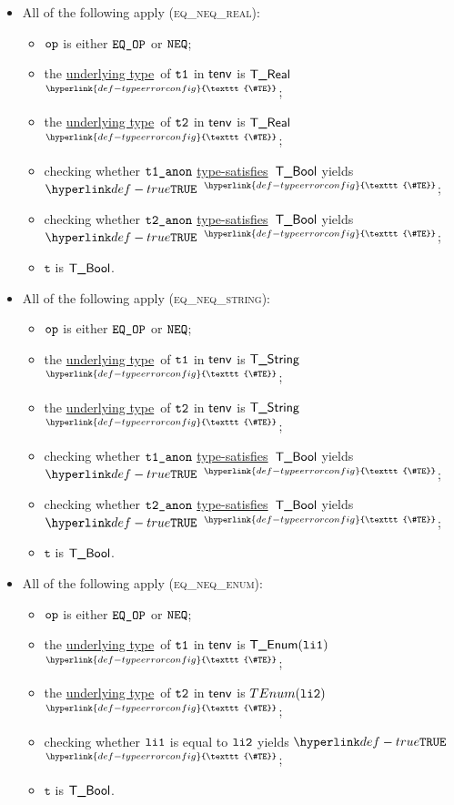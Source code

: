 \documentclass{book}
\newcommand\TypeErrorConfig[0]{\hyperlink{def-typeerrorconfig}{\texttt{\#TE}}}
\newcommand\ProseOrTypeError[0]{\hyperlink{def-proseortypeerror}{$^{\TypeErrorConfig}$}}
\newcommand\underlyingtype[0]{\hyperlink{def-underlyingtype}{underlying type}}
\newcommand\typesatisfies[0]{\hyperlink{def-typesatisfies}{type-satisfies}}
\newcommand\vt[0]{\texttt{t}}
\begin{document}
\begin{itemize}
  \item All of the following apply (\textsc{eq\_neq\_real}):
  \begin{itemize}
    \item $\texttt{op}$ is either $\texttt{EQ\_OP}$ or $\texttt{NEQ}$;
    \item the \underlyingtype\ of $\texttt{t1}$ in $\textsf{tenv}$ is $\textsf{T\_Real}$ \ProseOrTypeError;
    \item the \underlyingtype\ of $\texttt{t2}$ in $\textsf{tenv}$ is $\textsf{T\_Real}$ \ProseOrTypeError;
    \item checking whether $\texttt{t1\_anon}$ \typesatisfies\ $\textsf{T\_Bool}$ yields $\True$ \ProseOrTypeError;
    \item checking whether $\texttt{t2\_anon}$ \typesatisfies\ $\textsf{T\_Bool}$ yields $\True$ \ProseOrTypeError;
    \item $\vt$ is $\textsf{T\_Bool}$.
  \end{itemize}

  \item All of the following apply (\textsc{eq\_neq\_string}):
  \begin{itemize}
    \item $\texttt{op}$ is either $\texttt{EQ\_OP}$ or $\texttt{NEQ}$;
    \item the \underlyingtype\ of $\texttt{t1}$ in $\textsf{tenv}$ is $\textsf{T\_String}$ \ProseOrTypeError;
    \item the \underlyingtype\ of $\texttt{t2}$ in $\textsf{tenv}$ is $\textsf{T\_String}$ \ProseOrTypeError;
    \item checking whether $\texttt{t1\_anon}$ \typesatisfies\ $\textsf{T\_Bool}$ yields $\True$ \ProseOrTypeError;
    \item checking whether $\texttt{t2\_anon}$ \typesatisfies\ $\textsf{T\_Bool}$ yields $\True$ \ProseOrTypeError;
    \item $\vt$ is $\textsf{T\_Bool}$.
  \end{itemize}

  \item All of the following apply (\textsc{eq\_neq\_enum}):
  \begin{itemize}
    \item $\texttt{op}$ is either $\texttt{EQ\_OP}$ or $\texttt{NEQ}$;
    \item the \underlyingtype\ of $\texttt{t1}$ in $\textsf{tenv}$ is $\textsf{T\_Enum}(\texttt{li1})$ \ProseOrTypeError;
    \item the \underlyingtype\ of $\texttt{t2}$ in $\textsf{tenv}$ is $\\TEnum(\texttt{li2})$ \ProseOrTypeError;
    \item checking whether $\texttt{li1}$ is equal to $\texttt{li2}$ yields $\True$ \ProseOrTypeError;
    \item $\vt$ is $\textsf{T\_Bool}$.
  \end{itemize}


\end{itemize}
\end{document}
